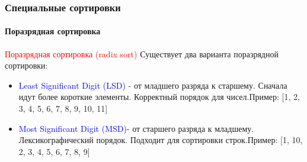 \documentclass[aspectratio=169]{beamer}
\begin{document}
\begin{frame}
\frametitle{Специальные сортировки}
\framesubtitle{Поразрядная сортировка}
\justifying
\textcolor{red}{Поразрядная сортировка (radix sort)}\newline
Существует два варианта поразрядной сортировки:
\begin{itemize}
    \item{\textcolor{blue}{Least Significant Digit (LSD)} - от младшего разряда к старшему. Сначала идут более короткие элементы. Корректный порядок для чисел.\newline\newline Пример: [1, 2, 3, 4, 5, 6, 7, 8, 9, 10, 11]\newline}
    \item{\textcolor{blue}{Most Significant Digit (MSD)}- от старшего разряда к младшему. Лексикографический порядок. Подходит для сортировки строк.\newline\newline Пример: [1, 10, 2, 3, 4, 5, 6, 7, 8, 9]}
\end{itemize}
\end{frame}
\end{document}
